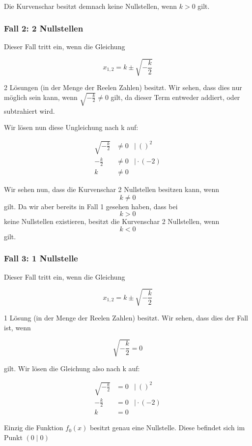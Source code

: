 \documentclass[12pt,a4paper]{article}
\begin{document}
Die Kurvenschar besitzt demnach keine Nullstellen, wenn $k>0$ gilt.

\subsubsection{Fall 2: 2 Nullstellen}


Dieser Fall tritt ein, wenn die Gleichung 

$$ x_{1,2} = k \pm \sqrt {-\frac k 2} $$

2 Lösungen (in der Menge der Reelen Zahlen) besitzt. Wir sehen, dass dies nur möglich sein kann, wenn $\sqrt {-\frac k 2} \neq 0 $ gilt, da dieser Term entweder addiert, oder subtrahiert wird.

Wir lösen nun diese Ungleichung nach k auf:

$$
\begin{aligned}
    \sqrt{-\frac{k}{2}} & \neq 0 & \mid \> ()^2 \\
    - \frac{k}{2} & \neq 0 & \mid \cdot (-2) \\
    k & \neq 0
\end{aligned}
$$

Wir sehen nun, dass die Kurvenschar 2 Nullstellen besitzen kann, wenn $$k\neq 0$$ gilt. Da wir aber bereits in Fall 1 gesehen haben, dass bei $$k > 0$$ keine Nullstellen existieren, besitzt die Kurvenschar 2 Nullstellen, wenn $$k < 0$$ gilt.

\subsubsection{Fall 3: 1 Nullstelle}

Dieser Fall tritt ein, wenn die Gleichung 

$$  x_{1,2} = k \pm \sqrt {-\frac k 2} $$

1 Lösung (in der Menge der Reelen Zahlen) besitzt. Wir sehen, dass dies der Fall ist, wenn

$$ \sqrt {-\frac k 2} = 0 $$

gilt. Wir lösen die Gleichung also nach k auf:

$$
\begin{aligned}
    \sqrt{-\frac{k}{2}} & = 0 & \mid \> ()^2 \\
    - \frac{k}{2} & = 0 & \mid \cdot (-2) \\
    k & = 0
\end{aligned}
$$

Einzig die Funktion $f_0(x)$ besitzt genau eine Nullstelle. Diese befindet sich im Punkt $(0 \mid 0)$ 
\end{document}
